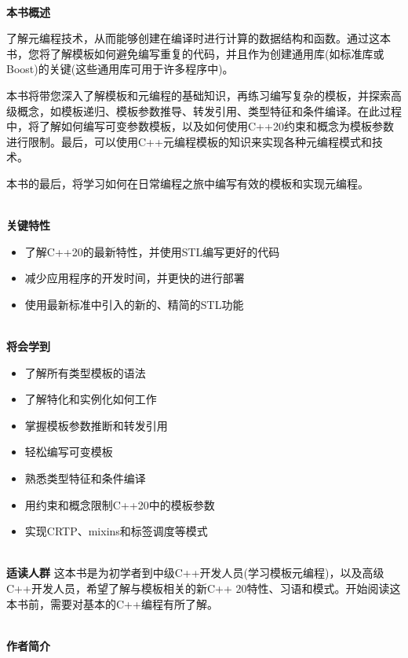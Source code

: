 \documentclass[11pt,a4paper,UTF8]{book}
\begin{document}
\begin{sloppypar}
		\hspace*{\fill} \\ %
		\noindent\textbf{本书概述}
		
		了解元编程技术，从而能够创建在编译时进行计算的数据结构和函数。通过这本书，您将了解模板如何避免编写重复的代码，并且作为创建通用库(如标准库或Boost)的关键(这些通用库可用于许多程序中)。
		
		本书将带您深入了解模板和元编程的基础知识，再练习编写复杂的模板，并探索高级概念，如模板递归、模板参数推导、转发引用、类型特征和条件编译。在此过程中，将了解如何编写可变参数模板，以及如何使用C++20约束和概念为模板参数进行限制。最后，可以使用C++元编程模板的知识来实现各种元编程模式和技术。
		
		本书的最后，将学习如何在日常编程之旅中编写有效的模板和实现元编程。
		
		\hspace*{\fill} \\ %
		\noindent\textbf{关键特性}
		\begin{itemize}
			\item 了解C++20的最新特性，并使用STL编写更好的代码
			\item 减少应用程序的开发时间，并更快的进行部署
			\item 使用最新标准中引入的新的、精简的STL功能
		\end{itemize}
		
		\hspace*{\fill} \\ %
		\noindent\textbf{将会学到}
		\begin{itemize}
			\item 了解所有类型模板的语法
			\item 了解特化和实例化如何工作
			\item 掌握模板参数推断和转发引用
			\item 轻松编写可变模板
			\item 熟悉类型特征和条件编译
			\item 用约束和概念限制C++20中的模板参数
			\item 实现CRTP、mixins和标签调度等模式
		\end{itemize}
	
		\hspace*{\fill} \\ %
		\noindent\textbf{适读人群}
		这本书是为初学者到中级C++开发人员(学习模板元编程)，以及高级C++开发人员，希望了解与模板相关的新C++ 20特性、习语和模式。开始阅读这本书前，需要对基本的C++编程有所了解。
		
		\hspace*{\fill} \\ %
		\noindent\textbf{作者简介}
		

\end{sloppypar}
\end{document}
